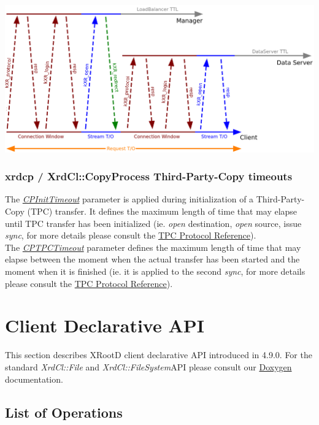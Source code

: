 \documentclass{article}
\begin{document}
			\begin{center}
   				\includegraphics[scale=0.25]{timeout.png}
   			\end{center}

			
		\subsubsection{xrdcp / XrdCl::CopyProcess Third-Party-Copy timeouts}
			The \hyperref[env:cpinittimeout]{\textit{CPInitTimeout}} parameter is applied during initialization of a Third-Party-Copy (TPC) transfer.
			It defines the maximum length of time that may elapse until TPC transfer has been initialized (ie. \textit{open} destination, \textit{open}
			source, issue \textit{sync}, for more details please consult the \href{http://xrootd.org/doc/dev49/tpc_protocol.htm}{TPC Protocol Reference}). \\
			The \hyperref[env:cptpctimeout]{\textit{CPTPCTimeout}} parameter defines the maximum length of time that may elapse between the moment when
			the actual transfer has been started and the moment when it is finished (ie. it is applied to the second \textit{sync}, for more details please 
			consult the \href{http://xrootd.org/doc/dev49/tpc_protocol.htm}{TPC Protocol Reference}). 


\section{Client Declarative API}

	This section describes XRootD client declarative API introduced in 4.9.0. For the standard 
	\textit{XrdCl::File} and \textit{XrdCl::FileSystem}API please consult our \href{http://xrootd.org/doc/doxygen/current/html/annotated.html}
	{Doxygen} documentation. 
	
	\subsection{List of Operations}
	
\end{document}
